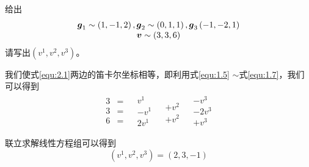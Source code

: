 \begin{example}
    给出
    \begin{equation*}
        \begin{array}{c}
            \boldsymbol{g}_1\sim \left( 1,-1,2 \right) ,\boldsymbol{g}_2\sim \left( 0,1,1 \right) ,\boldsymbol{g}_3\left( -1,-2,1 \right)\\
            \boldsymbol{v}\sim \left( 3,3,6 \right)
        \end{array}
    \end{equation*}
    请写出$\left( v^1,v^2,v^3 \right) $。
\end{example}
\begin{solution}
    我们使式\eqref{equ:2.1}两边的笛卡尔坐标相等，即利用式\eqref{equ:1.5} $\sim$式\eqref{equ:1.7}，我们可以得到
    \begin{equation*}
        \begin{matrix}
            \begin{aligned}
            3&=\\
            3&=\\
            6&=\\
        \end{aligned}&		\begin{aligned}
            v^1\\
            -v^1\\
            2v^1\\
        \end{aligned}&		\begin{aligned}
            \\
            +v^2\\
            +v^2\\
        \end{aligned}&		\begin{aligned}
            -v^3\\
            -2v^3\\
            +v^3\\
        \end{aligned}\\
        \end{matrix}
    \end{equation*}
    联立求解线性方程组可以得到
    \begin{equation*}
        \left( v^1,v^2,v^3 \right) =\left( 2,3,-1 \right) 
    \end{equation*}
\end{solution}